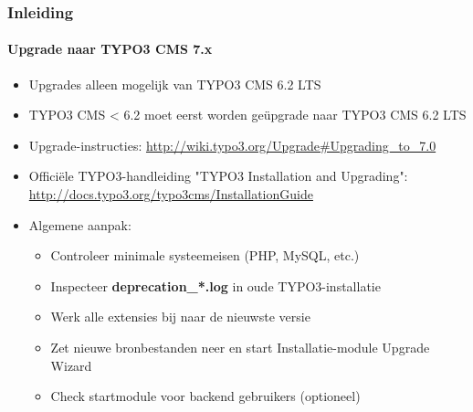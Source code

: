\begin{frame}[fragile]
	\frametitle{Inleiding}
	\framesubtitle{Upgrade naar TYPO3 CMS 7.x}

	\begin{itemize}
		\item Upgrades alleen mogelijk van TYPO3 CMS 6.2 LTS
		\item TYPO3 CMS < 6.2 moet eerst worden geüpgrade naar TYPO3 CMS 6.2 LTS
	\end{itemize}

	\begin{itemize}

		\item Upgrade-instructies:\newline
			\smaller\url{http://wiki.typo3.org/Upgrade#Upgrading_to_7.0}\normalsize
		\item Officiële TYPO3-handleiding "TYPO3 Installation and Upgrading":
			\smaller\url{http://docs.typo3.org/typo3cms/InstallationGuide}\normalsize
		\item Algemene aanpak:
			\begin{itemize}
				\item Controleer minimale systeemeisen (PHP, MySQL, etc.)
				\item Inspecteer \textbf{deprecation\_*.log} in oude TYPO3-installatie
				\item Werk alle extensies bij naar de nieuwste versie
				\item Zet nieuwe bronbestanden neer en start\newline
					Installatie-module \textrightarrow Upgrade Wizard
				\item Check startmodule voor backend gebruikers (optioneel)
			\end{itemize}
	\end{itemize}

\end{frame}

